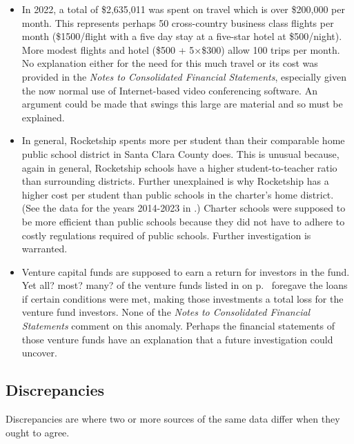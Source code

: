 \begin{itemize}
  \item In 2022, a total of \$2,635,011 was spent on travel which is over \$200,000 per month. This represents perhaps 50 cross-country business class flights per month (\$1500/flight with a five day stay at a five-star hotel at \$500/night).  More modest flights and hotel (\$500 + 5×\$300) allow 100 trips per month.  No explanation either for the need for this much travel or its cost was provided in the \textit{Notes to Consolidated Financial Statements}, especially given the now normal use of Internet-based video conferencing software. An argument could be made that swings this large are material and so must be explained.
  
  \item In general, Rocketship spents more per student than their comparable home public school district in Santa Clara County does. This is unusual because, again in general, Rocketship schools have a higher student-to-teacher ratio than surrounding districts. Further unexplained is why Rocketship has a higher cost per student than public schools in the charter's home district. (See the data for the years 2014-2023 in \textcite{SCCOE14-23}.) Charter schools were supposed to be more efficient than public schools because they did not have to adhere to costly regulations required of public schools. Further investigation is warranted.

  \item Venture capital funds are supposed to earn a return for investors in the fund. Yet all? most? many? of the venture funds listed in  on p.~\pageref{tab:venture_captial_funding} foregave the loans if certain conditions were met, making those investments a total loss for the venture fund investors. None of the \textit{Notes to Consolidated Financial Statements} comment on this anomaly. Perhaps the financial statements of those venture funds have an explanation that a future investigation could uncover.

\end{itemize}

\subsection{Discrepancies}%
\label{sec:discrepancies}\indent%

Discrepancies are where two or more sources of the same data differ when they ought to agree.

